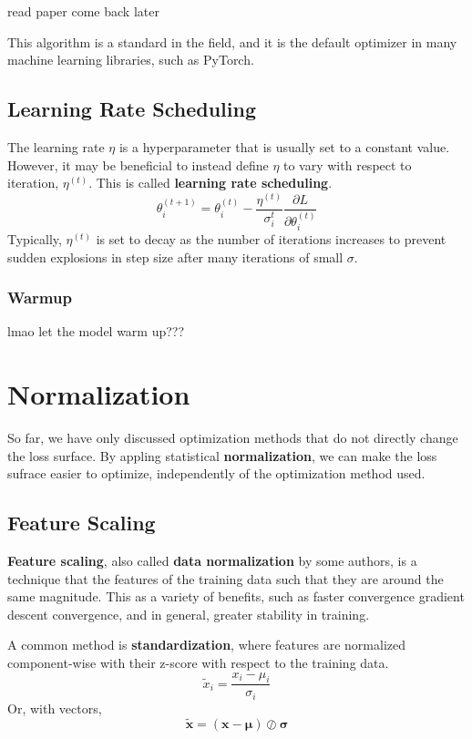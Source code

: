 \documentclass[12pt]{report}
\theoremstyle{definition}
\theoremstyle{remark}
\begin{document}
\cite{kingma_adam_2017}

read paper come back later

This algorithm is a standard in the field, and it is the default optimizer in many machine learning libraries, such as PyTorch.

\subsection{Learning Rate Scheduling}

The learning rate $\eta$ is a hyperparameter that is usually set to a constant value. However, it may be beneficial to instead define $\eta$ to vary with respect to iteration, $\eta^{(t)}$. This is called \textbf{learning rate scheduling}.
\begin{equation}
    \theta_{i}^{(t+1)} = \theta_{i}^{(t)} - \frac{\eta^{(t)}}{\sigma_i^t}\frac{\partial L}{\partial \theta_i^{(t)}}
\end{equation}
Typically, $\eta^{(t)}$ is set to decay as the number of iterations increases to prevent sudden explosions in step size after many iterations of small $\sigma$.

\subsubsection{Warmup}

lmao let the model warm up???

\section{Normalization}
So far, we have only discussed optimization methods that do not directly change the loss surface. By appling statistical \textbf{normalization}, we can make the loss sufrace easier to optimize, independently of the optimization method used.

\subsection{Feature Scaling}
\textbf{Feature scaling}, also called \textbf{data normalization} by some authors, is a technique that the features of the training data such that they are around the same magnitude. This as a variety of benefits, such as faster convergence gradient descent convergence, and in general, greater stability in training.

A common method is \textbf{standardization}, where features are normalized component-wise with their z-score with respect to the training data.
\begin{equation}
    \tilde{x}_i = \frac{x_i - \mu_i}{\sigma_i}
\end{equation}
Or, with vectors,
\begin{equation}
    \tilde{\mathbf{x}} = (\mathbf{x} - \boldsymbol{\mu}) \oslash \boldsymbol{\sigma}
\end{equation}
\end{document}
